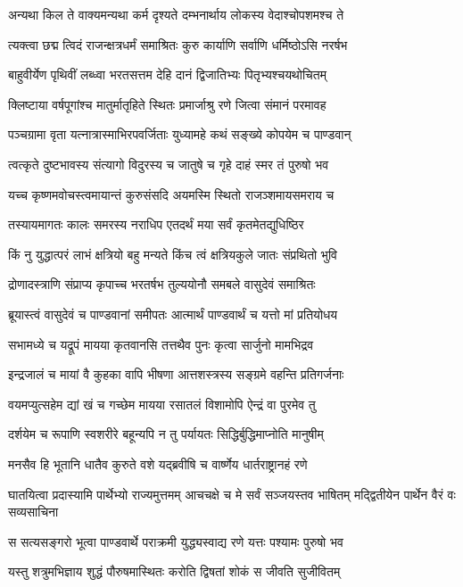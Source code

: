 \twolineshloka
{अन्यथा किल ते वाक्यमन्यथा कर्म दृश्यते}
{दम्भनार्थाय लोकस्य वेदाश्चोपशमश्च ते}


\twolineshloka
{त्यक्त्वा छद्म त्विदं राजन्क्षत्रधर्मं समाश्रितः}
{कुरु कार्याणि सर्वाणि धर्मिष्ठोऽसि नरर्षभ}


\twolineshloka
{बाहुवीर्येण पृथिवीं लब्ध्वा भरतसत्तम}
{देहि दानं द्विजातिभ्यः पितृभ्यश्चयथोचितम्}


\twolineshloka
{क्लिष्टाया वर्षपूगांश्च मातुर्मातृहिते स्थितः}
{प्रमार्जाश्रु रणे जित्वा संमानं परमावह}


\twolineshloka
{पञ्चग्रामा वृता यत्नात्रास्माभिरपवर्जिताः}
{युध्यामहे कथं सङ्ख्ये कोपयेम च पाण्डवान्}


\twolineshloka
{त्वत्कृते दुष्टभावस्य संत्यागो विदुरस्य च}
{जातुषे च गृहे दाहं स्मर तं पुरुषो भव}


\twolineshloka
{यच्च कृष्णमवोचस्त्वमायान्तं कुरुसंसदि}
{अयमस्मि स्थितो राजञ्शमायसमराय च}


\twolineshloka
{तस्यायमागतः कालः समरस्य नराधिप}
{एतदर्थं मया सर्वं कृतमेतद्युधिष्ठिर}


\twolineshloka
{किं नु युद्धात्परं लाभं क्षत्रियो बहु मन्यते}
{किंच त्वं क्षत्रियकुले जातः संप्रथितो भुवि}


\twolineshloka
{द्रोणादस्त्राणि संप्राप्य कृपाच्च भरतर्षभ}
{तुल्ययोनौ समबले वासुदेवं समाश्रितः}


\twolineshloka
{ब्रूयास्त्वं वासुदेवं च पाण्डवानां समीपतः}
{आत्मार्थं पाण्डवार्थं च यत्तो मां प्रतियोधय}


\twolineshloka
{सभामध्ये च यद्रूपं मायया कृतवानसि}
{तत्तथैव पुनः कृत्वा सार्जुनो मामभिद्रव}


\twolineshloka
{इन्द्रजालं च मायां वै कुहका वापि भीषणा}
{आत्तशस्त्रस्य सङ्ग्रमे वहन्ति प्रतिगर्जनाः}


\twolineshloka
{वयमप्युत्सहेम द्यां खं च गच्छेम मायया}
{रसातलं विशामोपि ऐन्द्रं वा पुरमेव तु}


\twolineshloka
{दर्शयेम च रूपाणि स्वशरीरे बहून्यपि}
{न तु पर्यायतः सिद्धिर्बुद्धिमाप्नोति मानुषीम्}


\twolineshloka
{मनसैव हि भूतानि धातैव कुरुते वशे}
{यद्ब्रवीषि च वार्ष्णेय धार्तराष्ट्रानहं रणे}


\threelineshloka
{घातयित्वा प्रदास्यामि पार्थेभ्यो राज्यमुत्तमम्}
{आचचक्षे च मे सर्वं सञ्जयस्तव भाषितम्}
{मद्द्वितीयेन पार्थेन वैरं वः सव्यसाचिना}


\twolineshloka
{स सत्यसङ्गरो भूत्वा पाण्डवार्थे पराक्रमी}
{युद्ध्यस्वाद्य रणे यत्तः पश्यामः पुरुषो भव}


\twolineshloka
{यस्तु शत्रुमभिज्ञाय शुद्धं पौरुषमास्थितः}
{करोति द्विषतां शोकं स जीवति सुजीवितम्}


